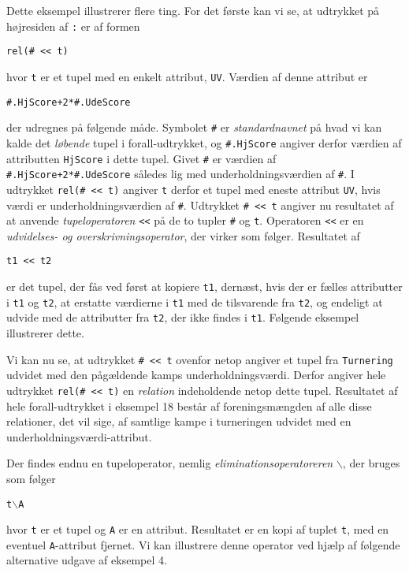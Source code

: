 \documentclass{article}
\newcounter{eks}
\begin{document}
Dette eksempel illustrerer flere ting. For det f\o{}rste kan vi se, at
udtrykket p\aa{} h\o{}jresiden af \verb":" er af formen
\begin{center}
\verb"rel(# << t)"
\end{center}
hvor \verb"t" er et tupel med en enkelt attribut, \verb"UV".
V\ae{}rdien af denne attribut er
\begin{center}
\verb"#.HjScore+2*#.UdeScore"
\end{center}
der udregnes p\aa{} f\o{}lgende m\aa{}de.
Symbolet \verb"#" er {\em standardnavnet\/} p\aa{} hvad vi kan kalde
det {\em l\o{}bende\/} tupel i forall-udtrykket, og
\verb"#.HjScore" angiver derfor v\ae{}rdien af attributten
\verb"HjScore" i dette tupel. Givet \verb"#" er v\ae{}rdien af
\verb"#.HjScore+2*#.UdeScore" s\aa{}ledes lig med underholdnings\-v\ae{}rdien
af \verb"#". I udtrykket \verb"rel(# << t)" angiver \verb"t" derfor
et tupel med eneste attribut \verb"UV", hvis v\ae{}rdi er
underholdningsv\ae{}rdien af \verb"#". Udtrykket \verb"# << t"
angiver nu resultatet af at anvende {\em tupeloperatoren\/}
\verb"<<" p\aa{} de to tupler \verb"#" og \verb"t". Operatoren
\verb"<<" er en {\em udvidelses- og overskrivningsoperator}, der virker
som f\o{}lger. Resultatet af
\begin{center}
\verb"t1 << t2"
\end{center}
er det tupel, der f\aa{}s ved f\o{}rst at kopiere \verb"t1",
dern\ae{}st, hvis der er f\ae{}lles attributter i \verb"t1" og \verb"t2",
at erstatte v\ae{}rdierne i \verb"t1" med de tilsvarende fra \verb"t2",
og endeligt at udvide med de attributter fra \verb"t2", der ikke findes
i \verb"t1". F\o{}lgende eksempel illustrerer dette.


Vi kan nu se, at udtrykket \verb"# << t" ovenfor netop angiver et tupel
fra \verb"Turnering" udvidet med den p\aa{}g\ae{}ldende kamps
underholdningsv\ae{}rdi. Derfor angiver hele udtrykket
\verb"rel(# << t)" en {\em relation\/} indeholdende netop dette tupel.
Resultatet af hele forall-udtrykket i eksempel 18 best\aa{}r af
foreningsm\ae{}ngden af alle disse relationer, det vil sige,
af samtlige kampe i turneringen udvidet med en
underholdningsv\ae{}rdi-attribut.

Der findes endnu en tupeloperator, nemlig {\em eliminationsoperatoreren\/}
$\backslash$, der bruges som f\o{}lger
\begin{center}
\verb"t"$\backslash$\verb"A"
\end{center}
hvor \verb"t" er et tupel og \verb"A" er en attribut. Resultatet er
en kopi af tuplet \verb"t", med en eventuel \verb"A"-attribut fjernet.
Vi kan illustrere denne operator ved hj\ae{}lp af f\o{}lgende alternative
udgave af eksempel 4.
\end{document}
